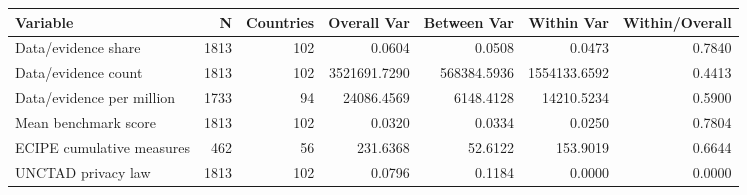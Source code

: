 \begin{tabular}{lrrrrrr}
\toprule
Variable & N & Countries & Overall Var & Between Var & Within Var & Within/Overall \\
\midrule
Data/evidence share & 1813 & 102 & 0.0604 & 0.0508 & 0.0473 & 0.7840 \\
Data/evidence count & 1813 & 102 & 3521691.7290 & 568384.5936 & 1554133.6592 & 0.4413 \\
Data/evidence per million & 1733 & 94 & 24086.4569 & 6148.4128 & 14210.5234 & 0.5900 \\
Mean benchmark score & 1813 & 102 & 0.0320 & 0.0334 & 0.0250 & 0.7804 \\
ECIPE cumulative measures & 462 & 56 & 231.6368 & 52.6122 & 153.9019 & 0.6644 \\
UNCTAD privacy law & 1813 & 102 & 0.0796 & 0.1184 & 0.0000 & 0.0000 \\
\bottomrule
\end{tabular}

